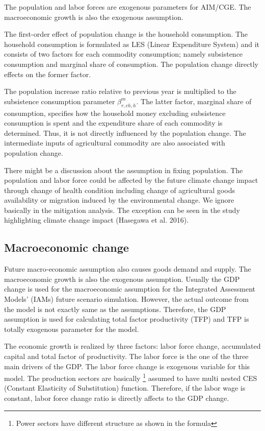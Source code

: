 \documentclass[10pt,a4paper,titlepage,dvipdfmx]{book}
\begin{document}
The population and labor forces are exogenous parameters for AIM/CGE. The macroeconomic growth is also the exogenous assumption.

The first-order effect of population change is the household consumption. The household consumption is formulated as LES (Linear Expenditure System) and it consists of two factors for each commodity consumption; namely subsistence consumption and marginal share of consumption. The population change directly effects on the former factor.

The population increase ratio relative to previous year is multiplied to the subsistence consumption parameter $\beta _{r,ch,h}^{m}$. The latter factor, marginal share of consumption, specifies how the household money excluding subsistence consumption is spent and the expenditure share of each commodity is determined. Thus, it is not directly influenced by the population change. The intermediate inputs of agricultural commodity are also associated with population change.

There might be a discussion about the assumption in fixing population. The population and labor force could be affected by the future climate change impact through change of health condition including change of agricultural goods availability or migration induced by the environmental change. We ignore basically in the mitigation analysis. The exception can be seen in the study highlighting climate change impact (Hasegawa et al. 2016).

\subsection{\label{subsec:MacCha}{Macroeconomic change}}

Future macro-economic assumption also causes goods demand and supply. The macroeconomic growth is also the exogenous assumption. Usually the GDP change is used for the macroeconomic assumption for the Integrated Assessment Models' (IAMs) future scenario simulation. However, the actual outcome from the model is not exactly same as the assumptions. Therefore, the GDP assumption is used for calculating total factor productivity (TFP) and TFP is totally exogenous parameter for the model.

The economic growth is realized by three factors: labor force change, accumulated capital and total factor of productivity. The labor force is the one of the three main drivers of the GDP. The labor force change is exogenous variable for this model. The production sectors are basically \footnote{Power sectors have different structure as shown in the formula} assumed to have multi nested CES (Constant Elasticity of Substitution) function. Therefore, if the labor wage is constant, labor force change ratio is directly affects to the GDP change.
\end{document}
